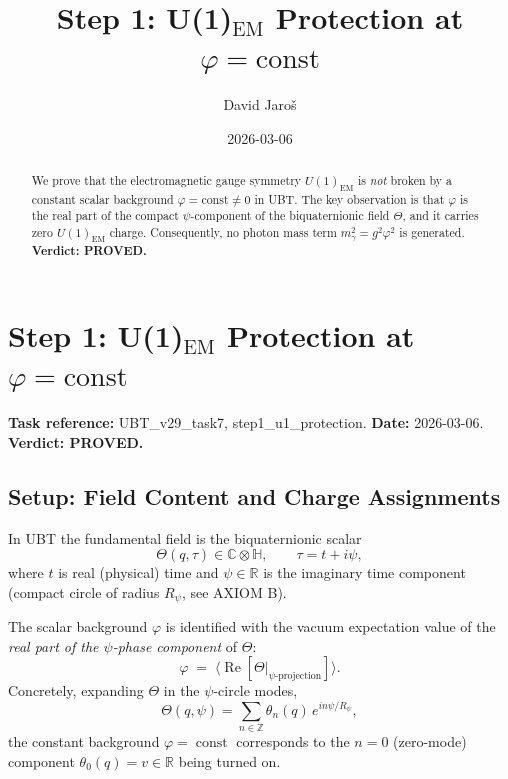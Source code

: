 \documentclass[12pt]{article}
\title{\textbf{Step 1: U(1)$_\mathrm{EM}$ Protection at $\varphi = \mathrm{const}$}}
\author{David Jaroš}
\date{2026-03-06}
\theoremstyle{definition}
\theoremstyle{remark}
\begin{document}
  \maketitle

  \begin{abstract}
  We prove that the electromagnetic gauge symmetry $U(1)_\mathrm{EM}$ is \emph{not} broken
  by a constant scalar background $\varphi = \mathrm{const} \neq 0$ in UBT.
  The key observation is that $\varphi$ is the real part of the compact $\psi$-component
  of the biquaternionic field $\Theta$, and it carries zero $U(1)_\mathrm{EM}$ charge.
  Consequently, no photon mass term $m_\gamma^2 = g^2\varphi^2$ is generated.
  \textbf{Verdict: PROVED.}
  \end{abstract}
\fi

\section{Step 1: U(1)$_\mathrm{EM}$ Protection at $\varphi = \mathrm{const}$}
\label{sec:u1_protection}

\textbf{Task reference:} UBT\_v29\_task7, step1\_u1\_protection.
\textbf{Date:} 2026-03-06.
\textbf{Verdict: PROVED.}

\subsection{Setup: Field Content and Charge Assignments}

In UBT the fundamental field is the biquaternionic scalar
\begin{equation}
  \Theta(q,\tau) \in \mathbb{C}\otimes\mathbb{H},
  \qquad \tau = t + i\psi,
\end{equation}
where $t$ is real (physical) time and $\psi \in \mathbb{R}$ is the imaginary time component
(compact circle of radius $R_\psi$, see AXIOM B).

The scalar background $\varphi$ is identified with the vacuum expectation value of the
\emph{real part of the $\psi$-phase component} of $\Theta$:
\begin{equation}
  \varphi \;=\; \langle \operatorname{Re}[\Theta\big|_{\psi\text{-projection}}] \rangle.
\end{equation}
Concretely, expanding $\Theta$ in the $\psi$-circle modes,
\begin{equation}
  \Theta(q,\psi) = \sum_{n\in\mathbb{Z}} \theta_n(q)\, e^{in\psi/R_\psi},
\end{equation}
the constant background $\varphi = \operatorname{const}$ corresponds to the $n=0$ (zero-mode)
component $\theta_0(q) = v \in \mathbb{R}$ being turned on.
\end{document}
